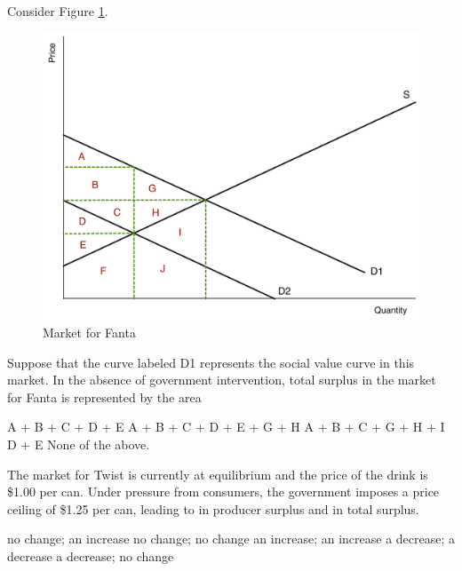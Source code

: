 \documentclass[addpoints,11pt]{exam}
\theoremstyle{definition}
\newcommand{\blank}[0]{\underline{\hspace{3cm}}}
\begin{document}
\begin{questions}
\newpage
		
\question Consider Figure \ref{MC25}. 

\begin{figure}[H]
	\centering
	\includegraphics[scale=.40]{Exam1_MC25.pdf}
	\caption{Market for Fanta}
	\label{MC25}
\end{figure}



Suppose that the curve labeled D1 represents the social value curve in this market. In the absence of government intervention, total surplus in the market for Fanta is represented by the area

\begin{choices}
	\CorrectChoice A + B + C + D + E
	\choice A + B + C + D + E + G + H
	\choice A + B + C + G + H + I
	\choice D + E
	\choice None of the above.
\end{choices}









\question The market for Twist is currently at equilibrium and the price of the drink is \$1.00 per can. Under pressure from consumers, the government imposes a price ceiling of \$1.25 per can, leading to \blank in producer surplus and \blank in total surplus.

\begin{choices}
	\choice no change; an increase
	\CorrectChoice no change; no change
	\choice an increase; an increase
	\choice a decrease; a decrease
	\choice a decrease; no change
\end{choices}



\end{questions}
\end{document}
